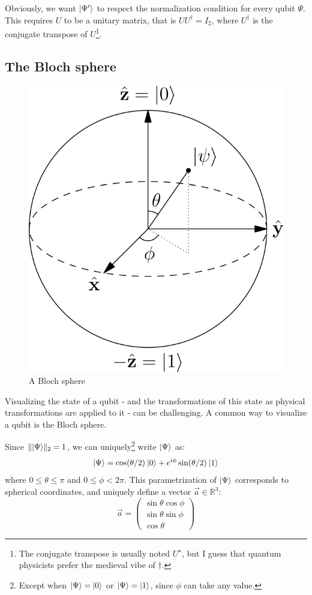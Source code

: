 \documentclass[12pt,a4paper]{article}
\theoremstyle{plain}
\theoremstyle{definition}
\DeclarePairedDelimiter\ket{\lvert}{\rangle}
\begin{document}
Obviously, we want $\ket{\Psi'}$ to respect the normalization condition for every qubit $\Psi$. This requires $U$ to be a unitary matrix, that is $UU^\dagger = I_2$, where $U^\dagger$ is the conjugate transpose of $U$\footnote{The conjugate transpose is usually noted $U^\star$, but I guess that quantum physicists prefer the medieval vibe of $\dagger$.}.

\subsection{The Bloch sphere}
\begin{figure}
    \centering
    \includegraphics*{bloch-sphere}
    \caption{A Bloch sphere}
\end{figure}

Visualizing the state of a qubit - and the transformations of this state as physical transformations are applied to it - can be challenging. A common way to visualize a qubit is the Bloch sphere.

Since $\|\ket{\Psi}\|_2=1$, we can uniquely\footnote{Except when $\ket{\Psi}=\ket{0}$ or $\ket{\Psi}=\ket{1}$, since $\phi$ can take any value.} write $\ket{\Psi}$ as:
\begin{equation*}
    \ket{\Psi}=\cos(\theta/2)\:\ket{0} + e^{i\phi}\sin(\theta/2)\: \ket{1}
\end{equation*}
where $0\leq\theta\leq\pi$ and $0\leq\phi<2\pi$. This parametrization of $\ket{\Psi}$ corresponds to spherical coordinates, and uniquely define a vector $\vec{a}\in\mathbb{R}^3$:
\begin{equation*}
    \vec{a}=\begin{pmatrix}\sin\theta\cos\phi\\\sin\theta\sin\phi\\\cos\theta\end{pmatrix}
\end{equation*}
\end{document}
